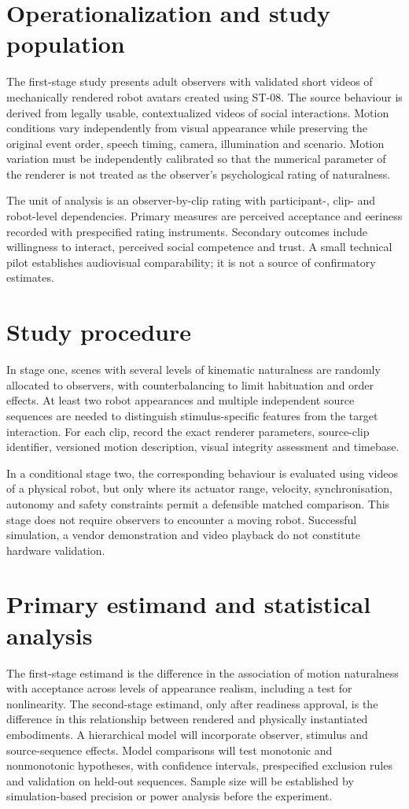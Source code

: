 \documentclass[11pt,a4paper]{article}
\begin{document}
\section{Operationalization and study population}
The first-stage study presents adult observers with validated short videos of mechanically rendered robot avatars created using ST-08. The source behaviour is derived from legally usable, contextualized videos of social interactions. Motion conditions vary independently from visual appearance while preserving the original event order, speech timing, camera, illumination and scenario. Motion variation must be independently calibrated so that the numerical parameter of the renderer is not treated as the observer's psychological rating of naturalness.

The unit of analysis is an observer-by-clip rating with participant-, clip- and robot-level dependencies. Primary measures are perceived acceptance and eeriness recorded with prespecified rating instruments. Secondary outcomes include willingness to interact, perceived social competence and trust. A small technical pilot establishes audiovisual comparability; it is not a source of confirmatory estimates.

\section{Study procedure}
In stage one, scenes with several levels of kinematic naturalness are randomly allocated to observers, with counterbalancing to limit habituation and order effects. At least two robot appearances and multiple independent source sequences are needed to distinguish stimulus-specific features from the target interaction. For each clip, record the exact renderer parameters, source-clip identifier, versioned motion description, visual integrity assessment and timebase.

In a conditional stage two, the corresponding behaviour is evaluated using videos of a physical robot, but only where its actuator range, velocity, synchronisation, autonomy and safety constraints permit a defensible matched comparison. This stage does not require observers to encounter a moving robot. Successful simulation, a vendor demonstration and video playback do not constitute hardware validation.

\section{Primary estimand and statistical analysis}
The first-stage estimand is the difference in the association of motion naturalness with acceptance across levels of appearance realism, including a test for nonlinearity. The second-stage estimand, only after readiness approval, is the difference in this relationship between rendered and physically instantiated embodiments. A hierarchical model will incorporate observer, stimulus and source-sequence effects. Model comparisons will test monotonic and nonmonotonic hypotheses, with confidence intervals, prespecified exclusion rules and validation on held-out sequences. Sample size will be established by simulation-based precision or power analysis before the experiment.
\end{document}
